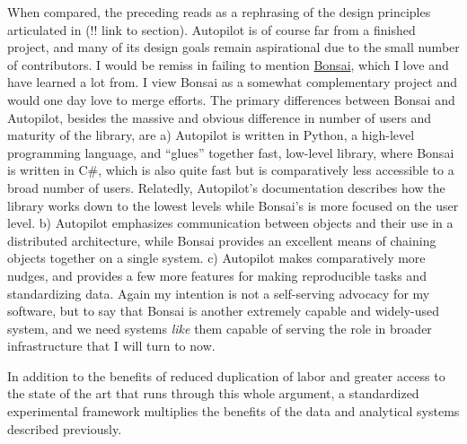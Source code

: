 \documentclass[nohyper]{tufte-book-jls}
\begin{document}
When compared, the preceding reads as a rephrasing of the design
principles articulated in (!! link to section). Autopilot is of course
far from a finished project, and many of its design goals remain
aspirational due to the small number of contributors. I would be remiss in failing to mention
\href{https://bonsai-rx.org/}{Bonsai}, which I love and have learned a
lot from. I view Bonsai as a somewhat complementary project and would
one day love to merge efforts. The primary differences between Bonsai
and Autopilot, besides the massive and obvious difference in number of
users and maturity of the library, are a) Autopilot is written in
Python, a high-level programming language, and ``glues'' together fast,
low-level library, where Bonsai is written in C\#, which is also quite
fast but is comparatively less accessible to a broad number of users.
Relatedly, Autopilot's documentation describes how the library works
down to the lowest levels while Bonsai's is more focused on the user
level. b) Autopilot emphasizes communication between objects and their
use in a distributed architecture, while Bonsai provides an excellent
means of chaining objects together on a single system. c) Autopilot
makes comparatively more nudges, and provides a few more features for
making reproducible tasks and standardizing data. Again my intention is
not a self-serving advocacy for my software, but to say that Bonsai is
another extremely capable and widely-used system, and we need systems
\emph{like} them capable of serving the role in broader infrastructure
that I will turn to now.

In addition to the benefits of reduced duplication of labor and greater
access to the state of the art that runs through this whole argument, a
standardized experimental framework multiplies the benefits of the data
and analytical systems described previously.
\end{document}
